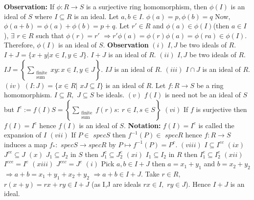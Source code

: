 \documentclass[11pt]{amsart}
\begin{document}
\newline \textbf{Observation:} If $\phi :R \rightarrow S$ is a surjective ring homomorphism, then $\phi(I)$ is an ideal of $S$ where $I\subseteq R$ is an ideal. Let $a,b \in I.$ $\phi(a)=p, \phi(b)=q$ Now, $\phi(a+b)=\phi(a)+\phi(b)=p+q.$ Let $r' \in R$ and $\phi(a) \in \phi(I)$(then $a\in I$), $\exists$ $r\in R$ such that $\phi(r)=r'$ $\Rightarrow r'\phi(a)=\phi(r)\phi(a)=\phi(ra) \in \phi(I).$ Therefore, $\phi(I)$ is an ideal of $S.$
\newline \textbf{Observation} $(i)$ $I,J$ be two ideals of $R.$ $I+J=\{x+y|x\in I, y\in J \}.$ $I+J$ is an ideal of $R.$
\newline  $(ii)$ $I,J$ be two ideals of $R.$ $IJ= \left\lbrace \displaystyle\sum_{\substack{\text{finite}\\ \text{sum}}}xy: x\in I, y\in J \right\rbrace.$ $IJ$ is an ideal of $R.$
\newline  $(iii)$ $I\cap J$ is an ideal of $R.$
\newline  $(iv)$ $(I:J)=\{x \in R|$ $xJ\subseteq I \}$ is an ideal of $R.$
\newline  Let $f: R \rightarrow S$ be a ring homomorphism. $I\subseteq R,$ $J\subseteq S$ be ideals.
\newline  $(v)$ $f(I)$ is need not be an ideal of $S$ but $I^{e}:=f(I)S=\left\lbrace \displaystyle\sum_{\substack{\text{finite}\\ \text{sum}}}f(r)s:~r\in I, s\in S \right\rbrace $
\newline  $(vi)$ If $f$ is surjective then $f(I)=I^{e}$ hence $f(I)$ is an ideal of $S.$
\newline \textbf{Notation:} $f(I)=I^{e}$ is called the expansion of $I$
\newline  $(vii)$ If $P \in$ $specS$ then $f^{-1}(P) \in$ $specR$ hence $f: R \rightarrow S$ induces a map $f_{\ast}:$  $specS \rightarrow specR$ by $P \mapsto f^{-1}(P)=P^{c}.$
\newline  $(viii)$ $I \subseteq I^{ec}$
\newline  $(ix)$ $J^{ce} \subseteq J$
\newline  $(x)$ $J_{1} \subseteq J_{2}$ in $S$ then $J_{1}^{c} \subseteq J_{2}^{c}$
\newline  $(xi)$ $I_{1} \subseteq I_{2}$ in $R$ then $I_{1}^{e} \subseteq I_{2}^{e}$
\newline  $(xii)$ $I^{ece}=I^{e}$
\newline  $(xiii)$ $J^{cec}=J^{c}$
\proof $(i)$ Pick $a,b \in I+J$ then $a=x_{1}+y_{1}$ and $b=x_{2}+y_{2}$ $\Rightarrow a+b=x_{1}+y_{1}+x_{2}+y_{2}$ $\Rightarrow a+b \in I+J.$ Take $r\in R,$ $r(x+y)=rx+ry\in I+J$ (as I,J are ideals $rx\in I,$ $ry\in J$). Hence $I+J$ is an ideal. \
\end{document}

